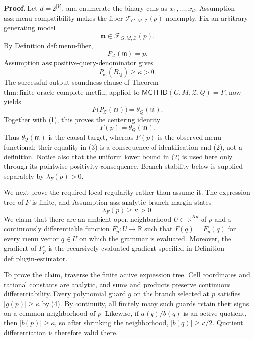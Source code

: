 \textbf{Proof.}
Let \(d=2^{|V|}\), and enumerate the binary cells as \(x_1,\ldots,x_d\).  Assumption \(\mathrm{ass:menu\text{-}compatibility}\) makes the fiber \(\mathcal F_{G,M,\mathcal Z}(p)\) nonempty.  Fix an arbitrary generating model
\[
 \mathfrak m\in\mathcal F_{G,M,\mathcal Z}(p).
\]
By Definition \(\mathrm{def:menu\text{-}fiber}\),
\[
 P_{\mathcal Z}(\mathfrak m)=p. \tag{1}
\]
Assumption \(\mathrm{ass:positive\text{-}query\text{-}denominator}\) gives
\[
 P_{\mathfrak m}(B_Q)\geq\kappa>0. \tag{2}
\]
The successful-output soundness clause of Theorem \(\mathrm{thm:finite\text{-}oracle\text{-}complete\text{-}mctfid}\), applied to \(\mathsf{MCTFID}(G,M,\mathcal Z,Q)=F\), now yields
\[
 F\bigl(P_{\mathcal Z}(\mathfrak m)\bigr)=\theta_Q(\mathfrak m).
\]
Together with (1), this proves the centering identity
\[
 F(p)=\theta_Q(\mathfrak m). \tag{3}
\]
Thus \(\theta_Q(\mathfrak m)\) is the causal target, whereas \(F(p)\) is the observed-menu functional; their equality in (3) is a consequence of identification and (2), not a definition.  Notice also that the uniform lower bound in (2) is used here only through its pointwise positivity consequence.  Branch stability below is supplied separately by \(\lambda_F(p)>0\).

We next prove the required local regularity rather than assume it.  The expression tree of \(F\) is finite, and Assumption \(\mathrm{ass:analytic\text{-}branch\text{-}margin}\) states
\[
 \lambda_F(p)\geq\kappa>0. \tag{4}
\]
We claim that there are an ambient open neighborhood \(U\subset\mathbb R^{Kd}\) of \(p\) and a continuously differentiable function \(F_p^{\circ}:U\to\mathbb R\) such that \(F(q)=F_p^{\circ}(q)\) for every menu vector \(q\in U\) on which the grammar is evaluated.  Moreover, the gradient of \(F_p^{\circ}\) is the recursively evaluated gradient specified in Definition \(\mathrm{def:plugin\text{-}estimator}\).

To prove the claim, traverse the finite active expression tree.  Cell coordinates and rational constants are analytic, and sums and products preserve continuous differentiability.  Every polynomial guard \(g\) on the branch selected at \(p\) satisfies \(|g(p)|\geq\kappa\) by (4).  By continuity, all finitely many such guards retain their signs on a common neighborhood of \(p\).  Likewise, if \(a(q)/b(q)\) is an active quotient, then \(|b(p)|\geq\kappa\), so after shrinking the neighborhood, \(|b(q)|\geq\kappa/2\).  Quotient differentiation is therefore valid there.

